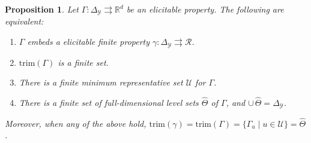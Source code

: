 \documentclass[11pt]{article}
\newcommand{\Comments}{1}
\newcommand{\mytodo}[2]{\ifnum\Comments=1%
  \todo[linecolor=#1!80!black,backgroundcolor=#1,bordercolor=#1!80!black]{#2}\fi}
\newcommand{\raft}[1]{\mytodo{green!20!white}{RF: #1}}
\newcommand{\jessiet}[1]{\mytodo{teal!20!white}{JF: #1}}
\newcommand{\reals}{\mathbb{R}}
\newcommand{\simplex}{\Delta_\Y}
\newcommand{\R}{\mathcal{R}}
\newcommand{\U}{\mathcal{U}}
\newcommand{\Y}{\mathcal{Y}}
\newcommand{\toto}{\rightrightarrows}
\newcommand{\trimred}{\mathrm{trim}}
\newtheorem{proposition}{Proposition}
\begin{document}
\begin{proposition}\label{prop:embed-trim}
  Let $\Gamma:\simplex\toto\reals^d$ be an elicitable property.
  The following are equivalent:
  \begin{enumerate}\setlength{\itemsep}{0pt}
  \item $\Gamma$ embeds a elicitable finite property $\gamma:\simplex \toto \R$.
  \item $\trimred(\Gamma)$ is a finite set.%
  \item There is a finite minimum representative set $\U$ for $\Gamma$.
  \item There is a finite set of full-dimensional level sets $\hat\Theta$ of $\Gamma$, and $\cup\,\hat\Theta = \simplex$.
  \end{enumerate}
  Moreover, when any of the above hold, $\trimred(\gamma) = \trimred(\Gamma) = \{\Gamma_u \mid u\in\U\} = \hat\Theta$.
\end{proposition}
\end{document}
